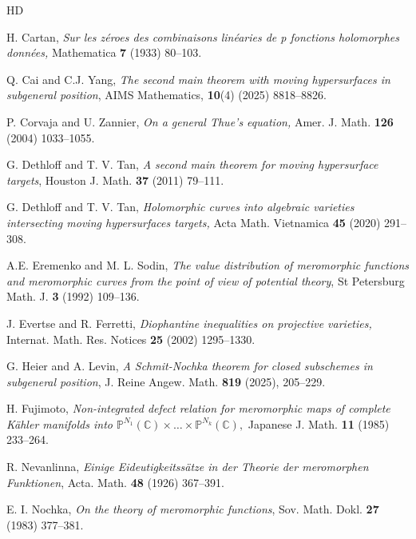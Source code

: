 \documentclass[12pt,leqno]{amsart}
\numberwithin{equation}{section}
\begin{document}
\begin{thebibliography}{HD}


 H. Cartan, \textit{Sur les z\'{e}roes des combinaisons lin\'{e}aries de p fonctions holomorphes donn\'{e}es,} Mathematica \textbf{7} (1933) 80--103.

 Q. Cai and C.J. Yang, \textit{The second main theorem with moving hypersurfaces in subgeneral position}, AIMS Mathematics, \textbf{10}(4) (2025) 8818--8826.

 P. Corvaja and U. Zannier, \textit{On a general Thue's equation,} Amer. J. Math. \textbf{126} (2004) 1033--1055.

 G. Dethloff and T. V. Tan, \textit{A second main theorem for moving hypersurface targets}, Houston J. Math. \textbf{37} (2011) 79--111.

 G. Dethloff and T. V. Tan, \textit{Holomorphic curves into algebraic varieties intersecting moving hypersurfaces targets,} Acta Math. Vietnamica \textbf{45} (2020) 291--308. 

 A.E. Eremenko and M. L. Sodin, \textit{The value distribution of meromorphic functions and meromorphic curves from the point of view of potential theory}, St Petersburg Math. J. \textbf{3} (1992) 109--136.

 J. Evertse and R. Ferretti, \textit{Diophantine inequalities on projective varieties,} Internat. Math. Res. Notices \textbf{25} (2002) 1295--1330.

 G. Heier and A. Levin, \textit{A Schmit-Nochka theorem for closed subschemes in subgeneral position}, J.
Reine Angew. Math. \textbf{819} (2025), 205--229.


 H. Fujimoto, \textit{Non-integrated defect relation for meromorphic maps of complete K\"ahler manifolds into  $\mathbb P^{N_1}(\mathbb C)\times \ldots  \times \mathbb P^{N_k}(\mathbb C),$} Japanese J. Math. \textbf{11} (1985) 233--264.

 R. Nevanlinna, \textit{Einige Eideutigkeitss\"atze in der Theorie der meromorphen Funktionen}, Acta. Math. \textbf{48} (1926) 367--391.

 E. I. Nochka, \textit{On the theory of meromorphic functions}, Sov. Math. Dokl. \textbf{27} (1983) 377--381.


\end{thebibliography}
\end{document}
